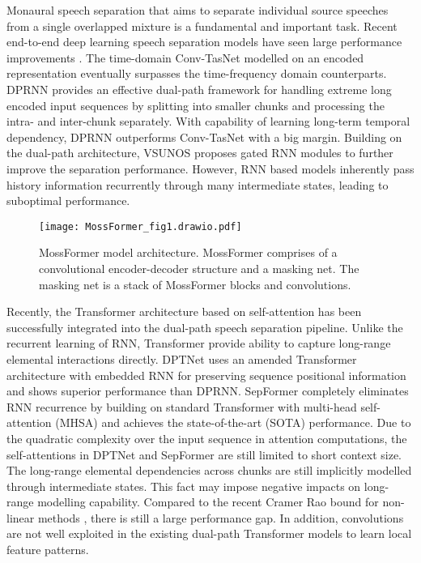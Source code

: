 \documentclass[9pt]{extarticle}
\begin{document}
Monaural speech separation that aims to separate individual source speeches from a single overlapped mixture is a fundamental and important task. 
Recent end-to-end deep learning speech separation models have seen large performance improvements  \cite{Luo2019N,Luo2020Z,Nachmani2020Y,Chen2020Q,Liu2019D,Tzinis2020Z,Zeghidour2021D,Subakan2021M}. The time-domain  Conv-TasNet  \cite{Luo2019N} modelled on an encoded representation eventually surpasses the time-frequency domain counterparts. DPRNN \cite{Luo2020Z} provides an effective dual-path framework for handling extreme long encoded input sequences by splitting into smaller chunks and processing the intra- and inter-chunk separately. With capability of learning long-term temporal dependency, DPRNN outperforms Conv-TasNet with a big margin. Building on the dual-path architecture, VSUNOS \cite{Nachmani2020Y} proposes gated RNN modules to further improve the separation performance. However, RNN based models inherently pass history information recurrently through many intermediate states, leading to suboptimal performance. 
\begin{figure}[t]
  \centering
  \texttt{[image: MossFormer\_fig1.drawio.pdf]}
  \caption{MossFormer model architecture. MossFormer comprises of a convolutional encoder-decoder structure and a masking net. The masking net is a stack of MossFormer blocks and convolutions.}
  \label{fig1}
\end{figure}
Recently, the Transformer architecture based on self-attention \cite{Vaswani2017N} has been successfully integrated into the dual-path speech separation pipeline. Unlike the recurrent learning of RNN, Transformer provide ability to capture long-range elemental interactions directly. DPTNet \cite{Chen2020Q}  uses an amended Transformer architecture with embedded RNN for preserving sequence positional information and shows superior performance than DPRNN. SepFormer \cite{Subakan2021M} completely eliminates RNN recurrence by building on standard Transformer with multi-head self-attention (MHSA) and achieves the state-of-the-art (SOTA) performance. Due to the quadratic complexity over the input sequence in attention computations, the self-attentions in DPTNet and SepFormer are still limited to short context size. The long-range elemental dependencies across chunks are still implicitly modelled through intermediate states. This fact may impose negative impacts on long-range modelling capability. Compared to the recent Cramer Rao bound for non-linear methods \cite{Lutati2022E}, there is still a large performance gap. In addition, convolutions are not well exploited in the existing dual-path Transformer models to learn local feature patterns.  
\end{document}
